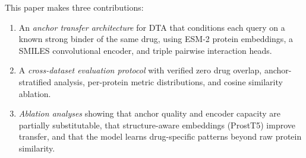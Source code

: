 This paper makes three contributions:
\begin{enumerate}
    \item An \emph{anchor transfer architecture} for DTA that conditions each query on a known strong binder of the same drug, using ESM-2 protein embeddings, a SMILES convolutional encoder, and triple pairwise interaction heads.
    \item A \emph{cross-dataset evaluation protocol} with verified zero drug overlap, anchor-stratified analysis, per-protein metric distributions, and cosine similarity ablation.
    \item \emph{Ablation analyses} showing that anchor quality and encoder capacity are partially substitutable, that structure-aware embeddings (ProstT5) improve transfer, and that the model learns drug-specific patterns beyond raw protein similarity.
\end{enumerate}
